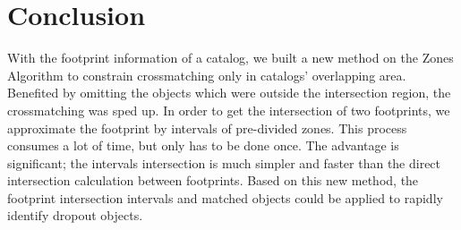 \section{Conclusion}
With the footprint information of a catalog, we built a new method on the Zones Algorithm to constrain crossmatching only in catalogs' overlapping area. Benefited by omitting the objects which were outside the intersection region, the crossmatching was sped up. In order to get the intersection of two footprints, we approximate the footprint by intervals of pre-divided zones. This process consumes a lot of time, but only has to be done once. The advantage is significant; the intervals intersection is much simpler and faster than the direct intersection calculation between footprints. Based on this new method, the footprint intersection intervals and matched objects could be applied to rapidly identify dropout objects.



